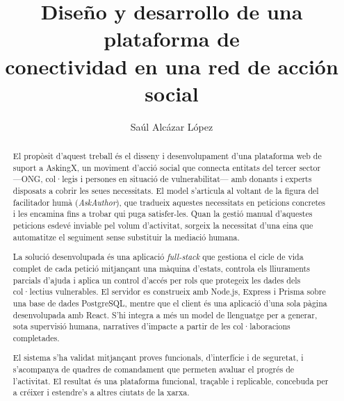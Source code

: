 \documentclass[11pt,oneside,spanish,listoffigures,listoftables]{tfgetsinf}
\title{Diseño y desarrollo de una plataforma de\\
         conectividad en una red de acción social}
\author{Saúl Alcázar López}
\begin{document}

\begin{abstract}
El propòsit d'aquest treball és el disseny i desenvolupament d'una plataforma web de suport a AskingX, un moviment d'acció social que connecta entitats del tercer sector —ONG, col·legis i persones en situació de vulnerabilitat— amb donants i experts disposats a cobrir les seues necessitats. El model s'articula al voltant de la figura del facilitador humà (\textit{AskAuthor}), que tradueix aquestes necessitats en peticions concretes i les encamina fins a trobar qui puga satisfer-les. Quan la gestió manual d'aquestes peticions esdevé inviable pel volum d'activitat, sorgeix la necessitat d'una eina que automatitze el seguiment sense substituir la mediació humana.

La solució desenvolupada és una aplicació \textit{full-stack} que gestiona el cicle de vida complet de cada petició mitjançant una màquina d'estats, controla els lliuraments parcials d'ajuda i aplica un control d'accés per rols que protegeix les dades dels col·lectius vulnerables. El servidor es construeix amb Node.js, Express i Prisma sobre una base de dades PostgreSQL, mentre que el client és una aplicació d'una sola pàgina desenvolupada amb React. S'hi integra a més un model de llenguatge per a generar, sota supervisió humana, narratives d'impacte a partir de les col·laboracions completades.

El sistema s'ha validat mitjançant proves funcionals, d'interfície i de seguretat, i s'acompanya de quadres de comandament que permeten avaluar el progrés de l'activitat. El resultat és una plataforma funcional, traçable i replicable, concebuda per a créixer i estendre's a altres ciutats de la xarxa.
\end{abstract}
\end{document}
